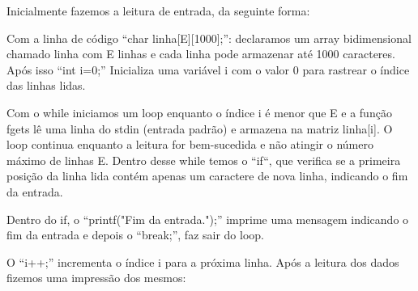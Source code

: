 \documentclass[a4wide]{report}
\begin{document}
Inicialmente fazemos a leitura de entrada, da seguinte forma: 

Com a linha de código “char linha[E][1000];”: declaramos um array bidimensional chamado linha com E linhas e cada linha pode armazenar até 1000 caracteres. Após isso “int i=0;” Inicializa uma variável i com o valor 0 para rastrear o índice das linhas lidas. 

Com o while iniciamos um loop enquanto o índice i é menor que E e a função fgets lê uma linha do stdin (entrada padrão) e armazena na matriz linha[i]. O loop continua enquanto a leitura for bem-sucedida e não atingir o número máximo de linhas E. Dentro desse while temos o “if“, que verifica se a primeira posição da linha lida contém apenas um caractere de nova linha, indicando o fim da entrada. 

Dentro do if, o “printf("Fim da entrada.");” imprime uma mensagem indicando o fim da entrada e depois o “break;”, faz sair do loop. 

O “i++;” incrementa o índice i para a próxima linha. 
Após a leitura dos dados fizemos uma impressão dos mesmos: 

 
\end{document}
